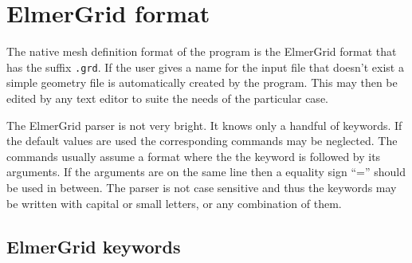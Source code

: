

\chapter{ElmerGrid format}

The native mesh definition format of the program is the ElmerGrid
format that has the suffix \texttt{.grd}. 
If the user gives a name for the input file that doesn't exist
a simple geometry file is automatically created by the program.
This may then be edited by any text editor to suite the needs of the particular case.

The ElmerGrid parser is not very bright. It knows only
a handful of keywords. If the default values are 
used the corresponding commands may be neglected. 
The commands usually assume a format where the 
the keyword is followed by its arguments. 
If the arguments are on the same line then a equality sign 
``='' should be used in between. 
The parser is not case sensitive and thus the keywords may be written with 
capital or small letters, or any combination of them.


\section{ElmerGrid keywords}

